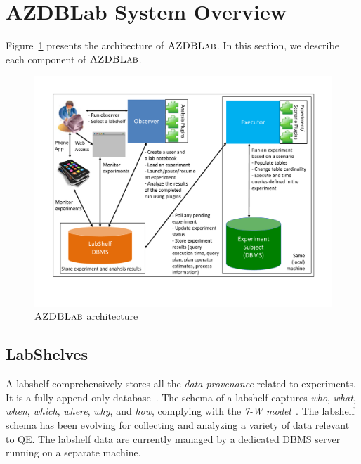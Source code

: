 \documentclass{vldb}
\def\azdb{\hbox{\sc AZDBLab}}
\begin{document}
\section{AZDBLab System Overview}\label{sec:architecture} 
Figure~\ref{fig:azdblab_arch} presents the architecture of $\azdb$. 
In this section, we describe each component of $\azdb$. 

\begin{figure}[htp!]
\centering
\includegraphics[scale=0.34]{./figures/azdblab_arch}
\caption{$\azdb$ architecture~\label{fig:azdblab_arch}}
\end{figure}

\subsection{LabShelves}
A labshelf comprehensively stores all the {\em data provenance} \hbox{related} to experiments. 
It is a fully append-only database~\cite{Snodgrass99}.
The schema of a labshelf \hbox{captures} {\em who}, {\em what}, {\em when}, {\em which}, {\em where}, {\em why}, and {\em how}, \hbox{complying} with the {\em 7-W model}~\cite{Ram}. 
The labshelf schema has been evolving for collecting and \hbox{analyzing} a \hbox{variety} of data relevant to QE.
The labshelf data are currently managed by a dedicated DBMS server \hbox{running} on a separate machine.  
\end{document}
